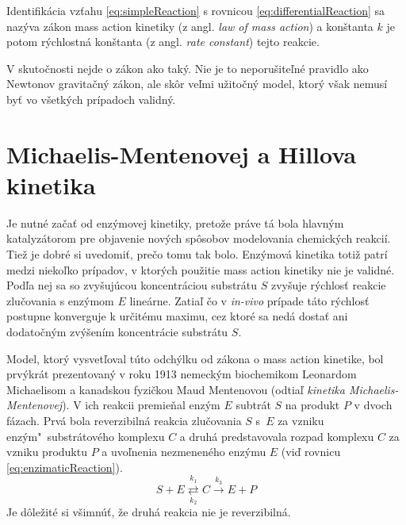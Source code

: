 \documentclass[11pt,final,oneside]{fithesis}
\begin{document}
Identifik\'acia vz\v tahu \ref{eq:simpleReaction} s rovnicou \ref{eq:differentialReaction} sa naz\'yva z\'akon mass action kinetiky (z angl. \textit{law of mass action}) a kon\v stanta $k$ 
je potom r\'ychlostn\'a kon\v stanta (z angl. \textit{rate constant}) tejto reakcie.

V skuto\v cnosti nejde o z\'akon ako tak\'y. Nie je to neporu\v site\v ln\'e pravidlo ako Newtonov gravita\v cn\'y z\'akon, ale sk\^ or ve\v lmi 
u\v zito\v cn\'y model, ktor\'y v\v sak nemus\'i by\v t vo v\v setk\'ych pr\'ipadoch validn\'y. \cite{Keener:1998:MP:MassAction}

\section{Michaelis-Mentenovej a Hillova kinetika}
\label{kinetiky}
Je nutn\'e za\v ca\v t od enz\'ymovej kinetiky, preto\v ze pr\'ave t\'a bola hlavn\'ym kata\-ly\-z\'atorom pre objavenie nov\'ych sp\^ osobov modelovania 
chemick\'ych reakci\'i. Tie\v z je dobr\'e si uvedomi\v t, pre\v co tomu tak bolo. Enz\'ymov\'a kinetika toti\v z patr\'i medzi nieko\v lko pr\'ipadov, 
v ktor\'ych pou\v zitie mass action kinetiky nie je validn\'e. Pod\v la nej sa so zvy\v suj\'ucou koncentr\'aciou substr\'atu $S$ zvy\v suje r\'ychlos\v t
reakcie zlu\v covania s enz\'ymom $E$ line\'arne. Zatia\v l \v co v \textit{in-vivo} pr\'ipade t\'ato r\'ychlos\v t postupne konverguje k ur\v cit\'emu 
maximu, cez ktor\'e sa ned\'a dosta\v t ani dodato\v cn\'ym zv\'y\v sen\'im koncentr\'acie substr\'atu $S$.

Model, ktor\'y vysvet\v loval t\'uto odch\'ylku od z\'akona o mass action kinetike, bol prv\'ykr\'at prezentovan\'y v roku 1913 nemeck\'ym biochemikom Leonardom 
Michaelisom a kanadskou fyzi\v ckou Maud Mentenovou (odtia\v l \textit{kinetika Michaelis-Mentenovej}). V ich reakcii premie\v nal enz\'ym $E$ subtr\'at $S$ 
na produkt $P$ v dvoch f\'azach. Prv\'a bola reverzibiln\'a reakcia zlu\v covania $S$ s~$E$ za vzniku enz\'ym"~substr\'atov\'eho komplexu $C$ a druh\'a 
predstavovala rozpad komplexu $C$ za vzniku produktu $P$ a uvo\v lnenia nezmenen\'eho enz\'ymu $E$ (vi\v d rovnicu \ref{eq:enzimaticReaction}).
\begin{equation}
\label{eq:enzimaticReaction}
S + E \underset{k_2}{\overset{k_1}{\rightleftarrows}} C \overset{k_3}{\longrightarrow} E + P
\end{equation}
Je d\^ ole\v zit\'e si v\v simn\'u\v t, \v ze druh\'a reakcia nie je reverzibiln\'a.
\end{document}
